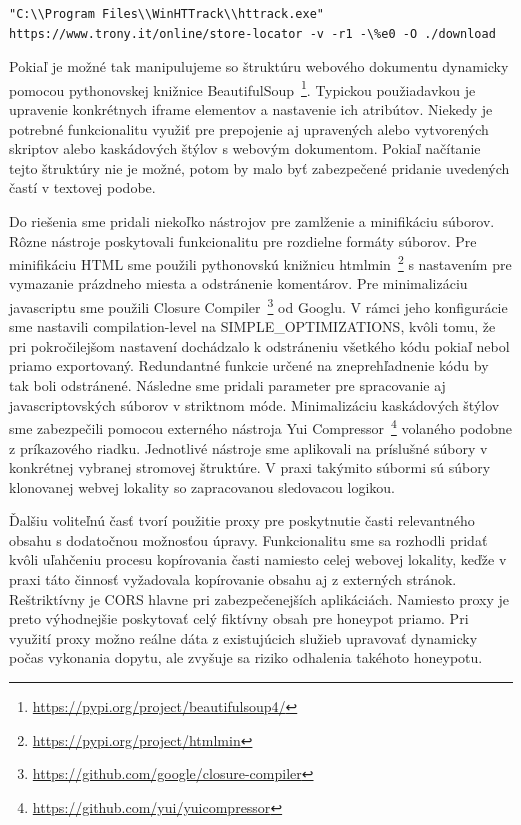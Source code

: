 \documentclass[conference, 11pt,slovak,a4paper,twoside]{IEEEtran}
\begin{document}
\begin{lstlisting}
"C:\\Program Files\\WinHTTrack\\httrack.exe" https://www.trony.it/online/store-locator -v -r1 -\%e0 -O ./download
\end{lstlisting}


Pokiaľ je možné tak manipulujeme so štruktúru webového dokumentu dynamicky pomocou pythonovskej knižnice BeautifulSoup~\footnote{\url{https://pypi.org/project/beautifulsoup4/}}. Typickou použiadavkou je upravenie konkrétnych iframe elementov a nastavenie ich atribútov. Niekedy je potrebné funkcionalitu využiť pre prepojenie aj upravených alebo vytvorených skriptov alebo kaskádových štýlov s webovým dokumentom. Pokiaľ načítanie tejto štruktúry nie je možné, potom by malo byť zabezpečené pridanie uvedených častí v textovej podobe.

Do riešenia sme pridali niekoľko nástrojov pre zamlženie a minifikáciu súborov. Rôzne nástroje poskytovali funkcionalitu pre rozdielne formáty súborov. Pre minifikáciu HTML sme použili pythonovskú knižnicu htmlmin~\footnote{\url{https://pypi.org/project/htmlmin}} s nastavením pre vymazanie prázdneho miesta a odstránenie komentárov. Pre minimalizáciu javascriptu sme použili Closure Compiler~\footnote{\url{https://github.com/google/closure-compiler}} od Googlu. V rámci jeho konfigurácie sme nastavili compilation-level na SIMPLE\_OPTIMIZATIONS, kvôli tomu, že pri pokročilejšom nastavení dochádzalo k odstráneniu všetkého kódu pokiaľ nebol priamo exportovaný. Redundantné funkcie určené na zneprehľadnenie kódu by tak boli odstránené. Následne sme pridali parameter pre spracovanie aj javascriptovských súborov v striktnom móde. Minimalizáciu kaskádových štýlov sme zabezpečili pomocou externého nástroja Yui Compressor~\footnote{\url{https://github.com/yui/yuicompressor}} volaného podobne z príkazového riadku. Jednotlivé nástroje sme aplikovali na príslušné súbory v konkrétnej vybranej stromovej štruktúre. V praxi takýmito súbormi sú súbory klonovanej webvej lokality so zapracovanou sledovacou logikou.

Ďalšiu voliteľnú časť tvorí použitie proxy pre poskytnutie časti relevantného obsahu s dodatočnou možnosťou úpravy. Funkcionalitu sme sa rozhodli pridať kvôli uľahčeniu procesu kopírovania časti namiesto celej webovej lokality, keďže v praxi táto činnosť vyžadovala kopírovanie obsahu aj z externých stránok. Reštriktívny je CORS hlavne pri zabezpečenejších aplikáciách. Namiesto proxy je preto výhodnejšie poskytovať celý fiktívny obsah pre honeypot priamo. Pri využití proxy možno reálne dáta z existujúcich služieb upravovať dynamicky počas vykonania dopytu, ale zvyšuje sa riziko odhalenia takéhoto honeypotu.
\end{document}

